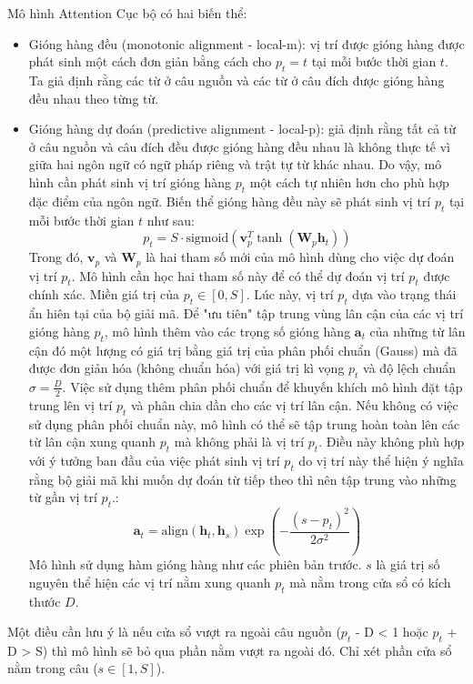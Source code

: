 Mô hình Attention Cục bộ có hai biến thể:
\begin{itemize}
	\item Gióng hàng đều (monotonic alignment - local-m): vị trí được gióng hàng được phát sinh một cách đơn giản bằng cách cho $p_t = t$ tại mỗi bước thời gian $t$. Ta giả định rằng các từ ở câu nguồn và các từ ở câu đích được gióng hàng đều nhau theo từng từ.
	\item Gióng hàng dự đoán (predictive alignment - local-p): giả định rằng tất cả từ ở câu nguồn và câu đích đều được gióng hàng đều nhau là không thực tế vì giữa hai ngôn ngữ có ngữ pháp riêng và trật tự từ khác nhau. Do vậy, mô hình cần phát sinh vị trí gióng hàng $p_t$ một cách tự nhiên hơn cho phù hợp đặc điểm của ngôn ngữ. Biến thể gióng hàng đều này sẽ phát sinh vị trí $p_t$ tại mỗi bước thời gian $t$ như sau:
	\begin{equation}
	p_t = S \cdot \text{sigmoid} (\bm{v}^T_p \tanh(\bm{W}_p \bm{h}_t))
	\end{equation}
	Trong đó, $\bm{v}_p$ và $\bm{W}_p$ là hai tham số mới của mô hình dùng cho việc dự đoán vị trí $p_t$. Mô hình cần học hai tham số này để có thể dự đoán vị trí $p_t$ được chính xác. Miền giá trị của $p_t \in [0, S]$. Lúc này, vị trí $p_t$ dựa vào trạng thái ẩn hiên tại của bộ giải mã.
	Để "ưu tiên" tập trung vùng lân cận của các vị trí gióng hàng $p_t$, mô hình thêm vào các trọng số gióng hàng $\bm{a}_t$ của những từ lân cận đó một lượng có giá trị bằng giá trị của phân phối chuẩn (Gauss) mà đã được đơn giản hóa (không chuẩn hóa) với giá trị kì vọng $p_t$ và độ lệch chuẩn $\sigma = \frac{D}{2}$. Việc sử dụng thêm phân phối chuẩn để khuyến khích mô hình đặt tập trung lên vị trí $p_t$ và phân chia dần cho các vị trí lân cận. Nếu không có việc sử dụng phân phối chuẩn này, mô hình có thể sẽ tập trung hoàn toàn lên các từ lân cận xung quanh $p_t$ mà không phải là vị trí $p_t$. Điều này không phù hợp với ý tưởng ban đầu của việc phát sinh vị trí $p_t$ do vị trí này thể hiện ý nghĩa rằng bộ giải mã khi muốn dự đoán từ tiếp theo thì nên tập trung vào những từ gần vị trí $p_t$.:
	\begin{equation}
	\bm{a}_t = \text{align}(\bm{h}_t, \bm{h}_s)\exp\left(-\frac{(s-p_t)^2}{2\sigma^2}\right)
	\end{equation}
	Mô hình sử dụng hàm gióng hàng như các phiên bản trước. $s$ là giá trị số nguyên thể hiện các vị trí nằm xung quanh $p_t$ mà nằm trong cửa sổ có kích thước $D$.
\end{itemize}

Một điều cần lưu ý là nếu cửa sổ vượt ra ngoài câu nguồn ($p_t$ - D < 1 hoặc $p_t$ + D > S) thì mô hình sẽ bỏ qua phần nằm vượt ra ngoài đó. Chỉ xét phần cửa sổ nằm trong câu ($s \in [1, S]$).
 
